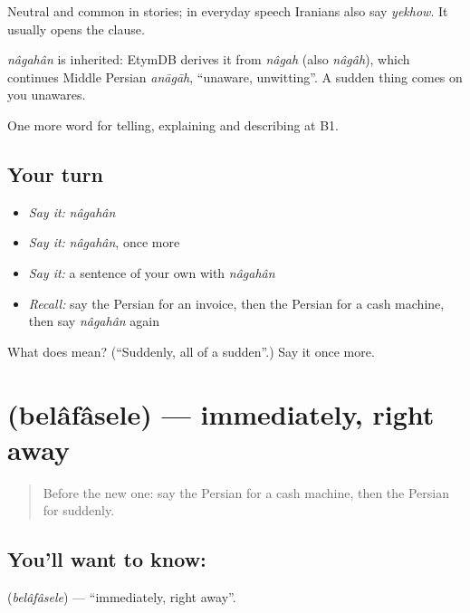Neutral and common in stories; in everyday speech Iranians also say \emph{yekhow}. It usually opens the clause.

\begin{cousinweb}
\emph{nâgahân} is inherited: EtymDB derives it from \emph{nâgah} (also \emph{nâgâh}), which continues Middle Persian \emph{anāgāh}, \textquotedblleft{}unaware, unwitting\textquotedblright{}. A sudden thing comes on you unawares.
\end{cousinweb}

\begin{grammarlens}[title={What you've built}]
One more word for telling, explaining and describing at B1.
\end{grammarlens}

\subsection*{Your turn}
\begin{itemize}
\raggedright
  \item \emph{Say it:} \emph{nâgahân}
  \item \emph{Say it:} \emph{nâgahân}, once more
  \item \emph{Say it:} a sentence of your own with \emph{nâgahân}
  \item \emph{Recall:} say the Persian for an invoice, then the Persian for a cash machine, then say \emph{nâgahân} again
\end{itemize}

\begin{tcolorbox}[breakable,colback=teal!4,colframe=teal!35!black,title={Before you move on}]
What does  mean? (\textquotedblleft{}Suddenly, all of a sudden\textquotedblright{}.) Say it once more.
\end{tcolorbox}
\section[\texorpdfstring{\fa{بلافاصله} (belâfâsele)}{بلافاصله (belâfâsele)}]{ (belâfâsele) — immediately, right away}

\label{lesson:FA-C300-belafasele}



\begin{quote}
Before the new one: say the Persian for a cash machine, then the Persian for suddenly.
\end{quote}

\subsection*{You'll want to know: }
\textbf{} (\emph{belâfâsele}) — \textquotedblleft{}immediately, right away\textquotedblright{}.

